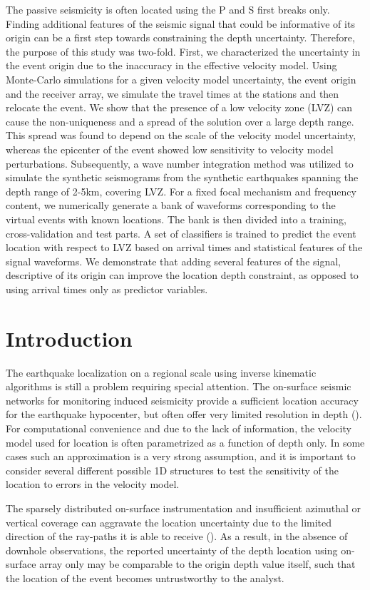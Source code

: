 \documentclass[letterpaper,11pt]{article}
\begin{document}
The passive seismicity is often located using the P and S first breaks only. Finding additional features of the seismic signal that could be informative of its origin can be a first step towards constraining the depth uncertainty. Therefore, the purpose of this study was two-fold. First, we characterized the uncertainty in the event origin due to the inaccuracy in the effective velocity model. Using Monte-Carlo simulations for a given velocity model uncertainty, the event origin and the receiver array, we simulate the travel times at the stations and then relocate the event. We show that the presence of a low velocity zone (LVZ) can cause the non-uniqueness and a spread of the solution over a large depth range. This spread was found to depend on the scale of the velocity model uncertainty, whereas the epicenter of the event showed low sensitivity to velocity model perturbations. Subsequently, a wave number integration method was utilized to simulate the synthetic seismograms from the synthetic earthquakes spanning the depth range of 2-5km, covering LVZ. For a fixed focal mechanism and frequency content, we numerically generate a bank of waveforms corresponding to the virtual events with known locations. The bank is then divided into a training, cross-validation and test parts. A set of classifiers is trained to predict the event location with respect to LVZ based on arrival times and statistical features of the signal waveforms. We demonstrate that adding several features of the signal, descriptive of its origin can improve the location depth constraint, as opposed to using arrival times only as predictor variables.
%
\section*{Introduction}
The earthquake localization on a regional scale using inverse kinematic algorithms is still a problem requiring special attention. The on-surface seismic networks for monitoring induced seismicity provide a sufficient location accuracy for the earthquake hypocenter, but often offer very limited resolution in depth (\cite{eisner_uncertainties_2009}). For computational convenience and due to the lack of information, the velocity model used for location is often parametrized as a function of depth only. In some cases such an approximation is a very strong assumption, and it is important to consider several different possible 1D structures to test the sensitivity of the location to errors in the velocity model.

The sparsely distributed on-surface instrumentation and insufficient azimuthal or vertical coverage can aggravate the location uncertainty due to the limited direction of the ray-paths it is able to receive (\cite{eisner_comparison_2010}). As a result, in the absence of downhole observations, the reported uncertainty of the depth location using on-surface array only may be comparable to the origin depth value itself, such that the location of the event becomes untrustworthy to the analyst. 
\end{document}
